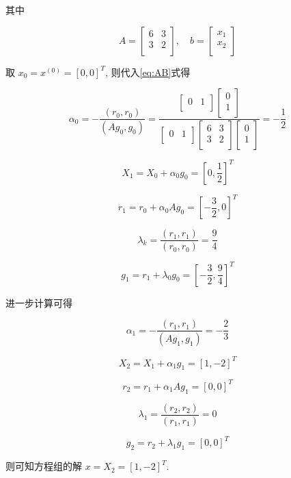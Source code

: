 \documentclass{article}
\begin{document}
其中　

$$
A=\begin{bmatrix}
6 & 3\\
3 & 2\\
\end{bmatrix},
\quad
b=\begin{bmatrix}
x_1\\
x_2\\
\end{bmatrix}
$$

取 $x_0=x^{(0)}=[0,0]^T$, 则代入\eqref{eq:AB}式得

$$
\alpha_0=-\frac{(r_0,r_0)}{(Ag_0,g_0)}=\frac{
\begin{bmatrix}
0 & 1\\
\end{bmatrix}
\begin{bmatrix}
0 \\
1\\
\end{bmatrix}
}{\begin{bmatrix}
0 & 1\\
\end{bmatrix}
\begin{bmatrix}
6 & 3\\
3 & 2\\
\end{bmatrix}
\begin{bmatrix}
0 \\
1\\
\end{bmatrix}
}=-\frac{1}{2}
$$

$$
X_1 = X_0+\alpha_0 g_0=[0,\frac{1}{2}]^T
$$

$$
r_1=r_0+\alpha_0Ag_0=[-\frac{3}{2},0]^T
$$

$$
\lambda_k=\frac{(r_1,r_1)}{(r_0,r_0)}=\frac{9}{4}
$$

$$
g_1=r_1+\lambda_0g_0=[-\frac{3}{2},\frac{9}{4}]^T
$$

进一步计算可得

$$
\alpha_1=-\frac{(r_1,r_1)}{(Ag_1,g_1)}=-\frac{2}{3}
$$

$$
X_2 = X_1+\alpha_1 g_1=[1,-2]^T
$$

$$
r_2=r_1+\alpha_1Ag_1=[0,0]^T
$$

$$
\lambda_1=\frac{(r_2,r_2)}{(r_1,r_1)}=0
$$

$$
g_2=r_2+\lambda_1g_1=[0,0]^T
$$

则可知方程组的解 $x=X_2 = [1,-2]^T$.
\newpage
\nocite{*}

\end{document}
